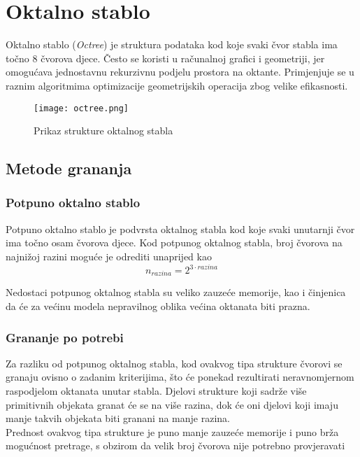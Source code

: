 \chapter{Oktalno stablo}
\label{chapter:octree}

Oktalno stablo (\textit{Octree}) je struktura podataka kod koje svaki čvor stabla
ima točno 8 čvorova djece. Često se koristi u računalnoj grafici i geometriji,
jer omogućava jednostavnu rekurzivnu podjelu prostora na oktante. Primjenjuje se
u raznim algoritmima optimizacije geometrijskih operacija zbog velike efikasnosti. ~\cite{octree}

\begin{figure}[ht]
    \centering
    \texttt{[image: octree.png]}
    \caption {Prikaz strukture oktalnog stabla}
\end{figure}

\section{Metode grananja}
\subsection{Potpuno oktalno stablo}

Potpuno oktalno stablo je podvrsta oktalnog stabla kod koje svaki unutarnji čvor
ima točno osam čvorova djece. Kod potpunog oktalnog stabla, broj čvorova na najnižoj razini
moguće je odrediti unaprijed kao
\[n_{razina} = 2^{3\cdot razina}\]

Nedostaci potpunog oktalnog stabla su veliko zauzeće memorije, kao i činjenica da će za većinu
modela nepravilnog oblika većina oktanata biti prazna.

\subsection{Grananje po potrebi}

Za razliku od potpunog oktalnog stabla, kod ovakvog tipa strukture čvorovi se granaju ovisno o zadanim
kriterijima, što će ponekad rezultirati neravnomjernom raspodjelom oktanata unutar stabla. Djelovi strukture
koji sadrže više primitivnih objekata granat će se na više razina, dok će oni djelovi koji imaju manje 
takvih objekata biti granani na manje razina.\\
Prednost ovakvog tipa strukture je puno manje zauzeće memorije i puno brža mogućnost pretrage, s obzirom
da velik broj čvorova nije potrebno provjeravati

